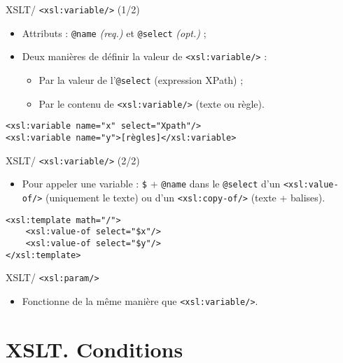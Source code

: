 \documentclass{beamer}
\begin{document}
    \begin{frame}[fragile]{XSLT/ \texttt{<xsl:variable/>} (1/2)}
        \Large
        \begin{itemize}
            \item Attributs : \texttt{@name} \textit{(req.)} et \texttt{@select} \textit{(opt.)} ;
            \bigskip
            \item Deux manières de définir la valeur de \texttt{<xsl:variable/>} :
            \begin{itemize}
            \Large
                \item Par la valeur de l'\texttt{@select} (expression XPath) ;
                \item Par le contenu de \texttt{<xsl:variable/>} (texte ou règle).
            \end{itemize}
        \end{itemize}
        \normalsize
        \begin{verbatim}
<xsl:variable name="x" select="Xpath"/>
<xsl:variable name="y">[règles]</xsl:variable>
        \end{verbatim}
    \end{frame}

    \begin{frame}[fragile]{XSLT/ \texttt{<xsl:variable/>} (2/2)}
        \Large
        \begin{itemize}
            \item  Pour appeler une variable : \texttt{\$} + \texttt{@name} dans le \texttt{@select} d'un \texttt{<xsl:value-of/>} (uniquement le texte) ou d'un \texttt{<xsl:copy-of/>} (texte + balises).
        \end{itemize}
        \large
        \begin{verbatim}
<xsl:template math="/">
    <xsl:value-of select="$x"/>
    <xsl:value-of select="$y"/>
</xsl:template>
        \end{verbatim}
    \end{frame}

    \begin{frame}{XSLT/ \texttt{<xsl:param/>}}
        \Large
        \begin{itemize}
            \item Fonctionne de la même manière que \texttt{<xsl:variable/>}.
        \end{itemize}
    \end{frame}

    \section{XSLT. Conditions}
\end{document}
